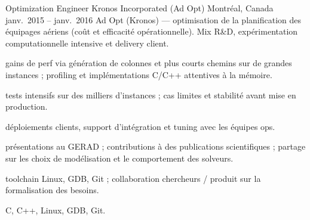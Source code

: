 \begin{cventries}
  \cventrywithintro
    {Optimization Engineer}
    {Kronos Incorporated (Ad Opt)}
    {Montréal, Canada}
    {janv.\ 2015 – janv.\ 2016}
    {Ad Opt (Kronos) --- optimisation de la planification des équipages aériens (coût et efficacité opérationnelle). Mix R\&D, expérimentation computationnelle intensive et delivery client.}
    {
      \begin{cvitemsafterintro}
        \item { gains de perf via génération de colonnes et plus courts chemins sur de grandes instances ; profiling et implémentations C/C++ attentives à la mémoire.}
        \item { tests intensifs sur des milliers d'instances ; cas limites et stabilité avant mise en production.}
        \item { déploiements clients, support d'intégration et tuning avec les équipes ops.}
        \item { présentations au GERAD ; contributions à des publications scientifiques ; partage sur les choix de modélisation et le comportement des solveurs.}
        \item { toolchain Linux, GDB, Git ; collaboration chercheurs / produit sur la formalisation des besoins.}
      \end{cvitemsafterintro}
    }
    {C, C++, Linux, GDB, Git.}

\end{cventries}
